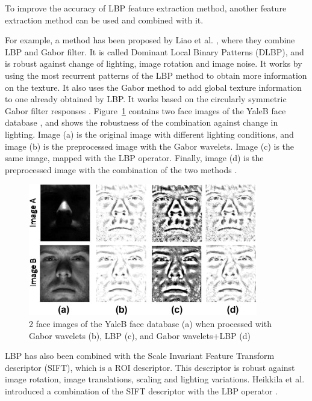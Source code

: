\vspace{\baselineskip}
\noindent To improve the accuracy of LBP feature extraction method, another feature extraction method can be used and combined with it. 
\newline

\noindent  For example, a method has been proposed by Liao et al. \cite{LIA09}, where they combine LBP and Gabor filter. It is called Dominant Local Binary Patterns (DLBP), and is robust against change of lighting, image rotation and image noise.  It works by using the most recurrent patterns of the LBP method to obtain more information on the texture. It also uses the Gabor method to add global texture information to one already obtained by LBP. It works based on the circularly symmetric Gabor filter responses \cite{LIA09}. Figure~\ref{combination_lbp_gabor} contains two face images of the YaleB face database , and shows the robustness of the combination against change in lighting. Image (a) is the original image with different lighting conditions, and image (b) is the preprocessed image with the Gabor wavelets. Image (c) is the same image, mapped with the LBP operator. Finally, image (d) is the preprocessed image with the combination of the two methods \cite{GOH11}.
\newline

\begin{figure}[!h]
\begin{center}
\noindent \includegraphics[scale=1]{figures/combination_lbp_gabor} 
\newline

\caption{2 face images of the YaleB face database (a) when processed with Gabor wavelets (b), LBP (c), and Gabor wavelets+LBP (d)\cite{GOH11}}
\label{combination_lbp_gabor}
\end{center} 
\end{figure}

\noindent  LBP has also been combined with the Scale Invariant Feature Transform descriptor (SIFT), which is a ROI descriptor. This descriptor is robust against image rotation, image translations, scaling and lighting variations. Heikkila et al. introduced a combination of the SIFT descriptor with the LBP operator \cite{HEI09}.
\newline

